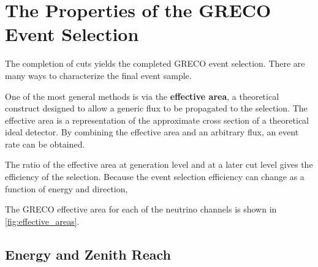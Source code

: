 \section{The Properties of the GRECO Event Selection}
The completion of cuts yields the completed GRECO event selection.
There are many ways to characterize the final event sample.

One of the most general methods is via the \textbf{effective area}, a theoretical construct designed to allow a generic flux to be propagated to the selection.
The effective area is a representation of the approximate cross section of a theoretical ideal detector.
By combining the effective area and an arbitrary flux, an event rate can be obtained.

The ratio of the effective area at generation level and at a later cut level gives the efficiency of the selection.
Because the event selection efficiency can change as a function of energy and direction, 

The GRECO effective area for each of the neutrino channels is shown in \ref{fig:effective_areas}.




\label{subsubsec:greco_truth}
\subsection{Energy and Zenith Reach}


